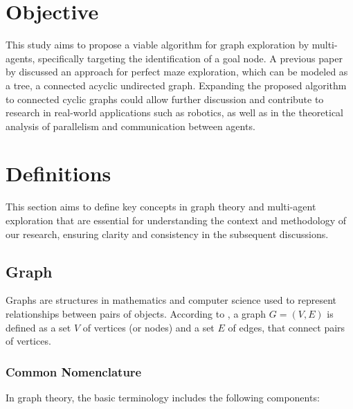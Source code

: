 \section{Objective}
\label{section_intro_objective}

This study aims to propose a viable algorithm for graph exploration by multi-agents, specifically targeting the identification of a goal node.
A previous paper by  discussed an approach for perfect maze exploration, which can be modeled as a tree, a connected acyclic undirected graph.
Expanding the proposed algorithm to connected cyclic graphs could allow further discussion and contribute to research in real-world applications 
such as robotics, as well as in the theoretical analysis of parallelism and communication between agents.

\section{Definitions}
\label{section_intro_definitions}

This section aims to define key concepts in graph theory and
multi-agent exploration that are essential for understanding the context 
and methodology of our research, ensuring clarity and consistency in the subsequent discussions.

\subsection{Graph}
\label{section_definitions_graph}

Graphs are structures in mathematics and computer science used to represent
relationships between pairs of objects. According to , a graph
$G=(V,E)$ is defined as a set $V$ of vertices (or nodes) and a set $E$ of edges,
that connect pairs of vertices. 

\subsubsection{Common Nomenclature}

In graph theory, the basic terminology includes the following components:

